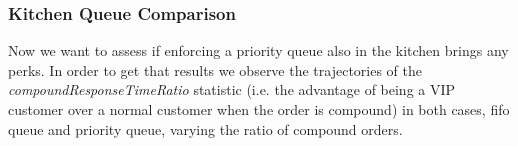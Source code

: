 % 


\subsubsection{Kitchen Queue Comparison}

Now we want to assess if enforcing a priority queue also in the kitchen brings any perks. In order to get that results we observe the trajectories of the \emph{compoundResponseTimeRatio} statistic (i.e. the advantage of being a VIP customer over a normal customer when the order is compound) in both cases, fifo queue and priority queue, varying the ratio of compound orders.

